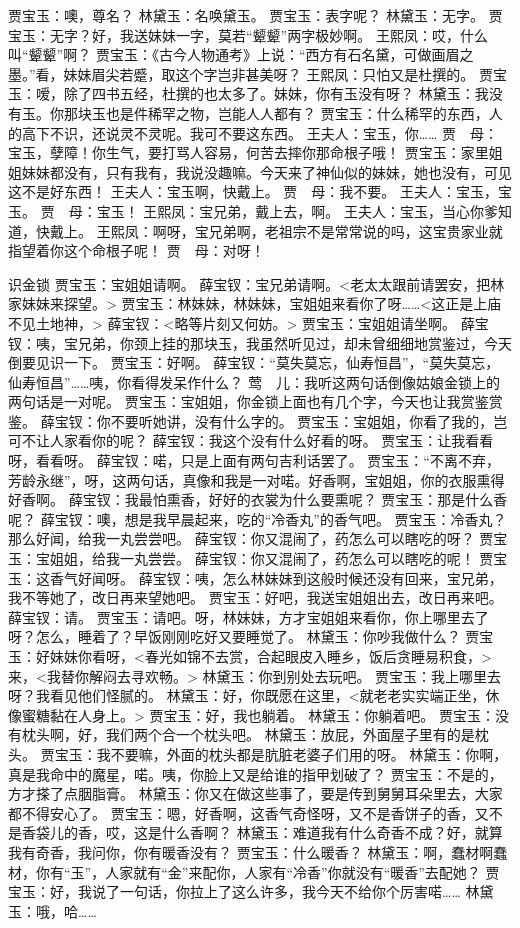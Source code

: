 \documentclass{article}
\begin{document}
贾宝玉：噢，尊名？
林黛玉：名唤黛玉。
贾宝玉：表字呢？
林黛玉：无字。
贾宝玉：无字？好，我送妹妹一字，莫若“颦颦”两字极妙啊。
王熙凤：哎，什么叫“颦颦”啊？
贾宝玉：《古今人物通考》上说：“西方有石名黛，可做画眉之墨。”看，妹妹眉尖若蹙，取这个字岂非甚美呀？
王熙凤：只怕又是杜撰的。
贾宝玉：嗳，除了四书五经，杜撰的也太多了。妹妹，你有玉没有呀？
林黛玉：我没有玉。你那块玉也是件稀罕之物，岂能人人都有？
贾宝玉：什么稀罕的东西，人的高下不识，还说灵不灵呢。我可不要这东西。
王夫人：宝玉，你……
贾　母：宝玉，孽障！你生气，要打骂人容易，何苦去摔你那命根子哦！
贾宝玉：家里姐姐妹妹都没有，只有我有，我说没趣嘛。今天来了神仙似的妹妹，她也没有，可见这不是好东西！
王夫人：宝玉啊，快戴上。
贾　母：我不要。
王夫人：宝玉，宝玉。
贾　母：宝玉！
王熙凤：宝兄弟，戴上去，啊。
王夫人：宝玉，当心你爹知道，快戴上。
王熙凤：啊呀，宝兄弟啊，老祖宗不是常常说的吗，这宝贵家业就指望着你这个命根子呢！
贾　母：对呀！

识金锁
贾宝玉：宝姐姐请啊。
薛宝钗：宝兄弟请啊。<老太太跟前请罢安，把林家妹妹来探望。>
贾宝玉：林妹妹，林妹妹，宝姐姐来看你了呀……<这正是上庙不见土地神，>
薛宝钗：<略等片刻又何妨。>
贾宝玉：宝姐姐请坐啊。
薛宝钗：咦，宝兄弟，你颈上挂的那块玉，我虽然听见过，却未曾细细地赏鉴过，今天倒要见识一下。
贾宝玉：好啊。
薛宝钗：“莫失莫忘，仙寿恒昌”，“莫失莫忘，仙寿恒昌”……咦，你看得发呆作什么？
莺　儿：我听这两句话倒像姑娘金锁上的两句话是一对呢。
贾宝玉：宝姐姐，你金锁上面也有几个字，今天也让我赏鉴赏鉴。
薛宝钗：你不要听她讲，没有什么字的。
贾宝玉：宝姐姐，你看了我的，岂可不让人家看你的呢？
薛宝钗：我这个没有什么好看的呀。
贾宝玉：让我看看呀，看看呀。
薛宝钗：喏，只是上面有两句吉利话罢了。
贾宝玉：“不离不弃，芳龄永继”，呀，这两句话，真像和我是一对喏。好香啊，宝姐姐，你的衣服熏得好香啊。
薛宝钗：我最怕熏香，好好的衣裳为什么要熏呢？
贾宝玉：那是什么香呢？
薛宝钗：噢，想是我早晨起来，吃的“冷香丸”的香气吧。
贾宝玉：冷香丸？那么好闻，给我一丸尝尝吧。
薛宝钗：你又混闹了，药怎么可以瞎吃的呀？
贾宝玉：宝姐姐，给我一丸尝尝。
薛宝钗：你又混闹了，药怎么可以瞎吃的呢！
贾宝玉：这香气好闻呀。
薛宝钗：咦，怎么林妹妹到这般时候还没有回来，宝兄弟，我不等她了，改日再来望她吧。
贾宝玉：好吧，我送宝姐姐出去，改日再来吧。
薛宝钗：请。
贾宝玉：请吧。呀，林妹妹，方才宝姐姐来看你，你上哪里去了呀？怎么，睡着了？早饭刚刚吃好又要睡觉了。
林黛玉：你吵我做什么？
贾宝玉：好妹妹你看呀，<春光如锦不去赏，合起眼皮入睡乡，饭后贪睡易积食，>来，<我替你解闷去寻欢畅。>
林黛玉：你到别处去玩吧。
贾宝玉：我上哪里去呀？我看见他们怪腻的。
林黛玉：好，你既愿在这里，<就老老实实端正坐，休像蜜糖黏在人身上。>
贾宝玉：好，我也躺着。
林黛玉：你躺着吧。
贾宝玉：没有枕头啊，好，我们两个合一个枕头吧。
林黛玉：放屁，外面屋子里有的是枕头。
贾宝玉：我不要嘛，外面的枕头都是肮脏老婆子们用的呀。
林黛玉：你啊，真是我命中的魔星，喏。咦，你脸上又是给谁的指甲划破了？
贾宝玉：不是的，方才搽了点胭脂膏。
林黛玉：你又在做这些事了，要是传到舅舅耳朵里去，大家都不得安心了。
贾宝玉：嗯，好香啊，这香气奇怪呀，又不是香饼子的香，又不是香袋儿的香，哎，这是什么香啊？
林黛玉：难道我有什么奇香不成？好，就算我有奇香，我问你，你有暖香没有？
贾宝玉：什么暖香？
林黛玉：啊，蠢材啊蠢材，你有“玉”，人家就有“金”来配你，人家有“冷香”你就没有“暖香”去配她？
贾宝玉：好，我说了一句话，你拉上了这么许多，我今天不给你个厉害喏……
林黛玉：哦，哈……
\end{document}
